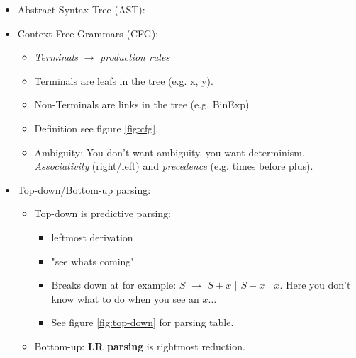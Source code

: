 \documentclass{article}
\begin{document}
\begin{itemize}
    \item Abstract Syntax Tree (AST): 
    \item Context-Free Grammars (CFG): 
    \begin{itemize}
        \item \textit{Terminals} $\rightarrow$ \textit{production rules}
        \item Terminals are leafs in the tree (e.g. x, y).
        \item Non-Terminals are links in the tree (e.g. BinExp)
        \item Definition see figure \ref{fig:cfg}.
        \item Ambiguity: You don't want ambiguity, you want determinism. \textit{Associativity} (right/left) and \textit{precedence} (e.g. times before plus).
    \end{itemize}
    \item Top-down/Bottom-up parsing:
    \begin{itemize}
        \item Top-down is predictive parsing:
        \begin{itemize}
            \item leftmost derivation
            \item "see whats coming"
            \item Breaks down at for example: $S$ $\rightarrow$ $S+x$ | $S-x$ | $x$. Here you don't know what to do when you see an $x\dots$
            \item See figure \ref{fig:top-down} for parsing table.
        \end{itemize}
        \item Bottom-up: \textbf{LR parsing} is rightmost reduction.
    \end{itemize}
\end{itemize}
\end{document}

